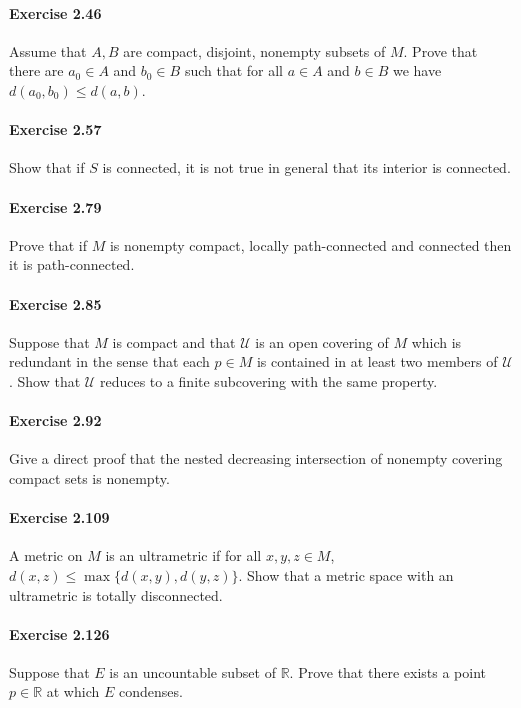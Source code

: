 \documentclass{article}
\begin{document}
\paragraph{Exercise 2.46} Assume that $A, B$ are compact, disjoint, nonempty subsets of $M$. Prove that there are $a_0 \in A$ and $b_0 \in B$ such that for all $a \in A$ and $b \in B$ we have $d(a_0, b_0) \leq d(a, b)$.


\paragraph{Exercise 2.57} Show that if $S$ is connected, it is not true in general that its interior is connected.


\paragraph{Exercise 2.79} Prove that if $M$ is nonempty compact, locally path-connected and connected then it is path-connected.


\paragraph{Exercise 2.85} Suppose that $M$ is compact and that $\mathcal{U}$ is an open covering of $M$ which is redundant in the sense that each $p \in M$ is contained in at least two members of $\mathcal{U}$. Show that $\mathcal{U}$ reduces to a finite subcovering with the same property.


\paragraph{Exercise 2.92} Give a direct proof that the nested decreasing intersection of nonempty covering compact sets is nonempty.


\paragraph{Exercise 2.109} A metric on $M$ is an ultrametric if for all $x, y, z \in M$, $d(x, z) \leq \max \{d(x, y), d(y, z)\} .$ Show that a metric space with an ultrametric is totally disconnected.


\paragraph{Exercise 2.126} Suppose that $E$ is an uncountable subset of $\mathbb{R}$. Prove that there exists a point $p \in \mathbb{R}$ at which $E$ condenses.
\end{document}
